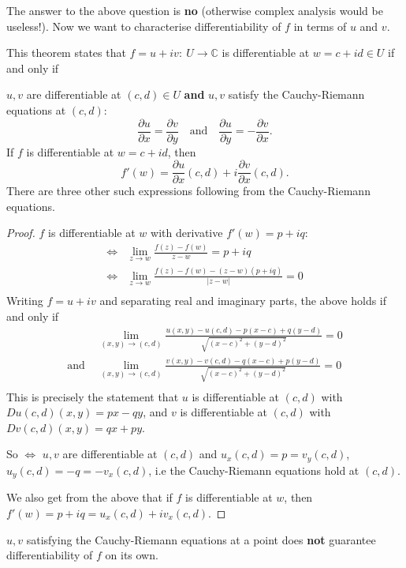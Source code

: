\documentclass[a4paper]{scrartcl}
\begin{document}
The answer to the above question is \textbf{no} (otherwise complex analysis would be useless!). Now we want to characterise differentiability of $f$ in terms of $u$ and $v$. 

\begin{theorem}
     This theorem states that $f=u+iv: \ U \rightarrow \mathbb{C}$ is differentiable at $w=c+id \in U$ if and only if 

     $u,v$ are differentiable at $(c,d) \in U$ \textbf{and} $u,v$ satisfy the Cauchy-Riemann equations at $(c,d)$: \[
     \frac{\partial u}{\partial x}=\frac{\partial v}{\partial y} \quad \text{and} \quad \frac{\partial u}{\partial y}=- \frac{\partial v}{\partial x}
     .\]  
     If $f$ is differentiable at $w=c+id$, then \[
     f' (w)= \frac{\partial u}{\partial x} (c,d)+i \frac{\partial v}{\partial x} (c,d)
     .\]  There are three other such expressions following from the Cauchy-Riemann equations. 
\end{theorem}
\begin{proof}
     $f$ is differentiable at $w$ with derivative $f' (w)=p+iq$:
     \begin{align*}
         \iff & \lim_{z \rightarrow w} \frac{f (z)- f (w)}{z-w}=p+iq\\
         \iff & \lim_{z \rightarrow w} \frac{f (z)- f (w)- (z-w)(p+iq)}{|z-w|}=0\\
     \end{align*}
     Writing $f=u+iv$ and separating real and imaginary parts, the above holds if and only if 
     \begin{align*}
        & \lim_{(x,y) \rightarrow (c,d)} \frac{u (x,y)- u (c,d)-p (x-c)+q (y-d)}{\sqrt{(x-c)^2+ (y-d)^2}}=0\\
        \text{and } & \lim_{(x,y) \rightarrow (c,d)} \frac{v (x,y)- v (c,d)-q (x-c)+p (y-d)}{\sqrt{(x-c)^2+ (y-d)^2}}=0\\
     \end{align*}
     This is precisely the statement that $u$ is differentiable at $(c,d)$ with $Du (c,d)(x,y)=px-qy$, and $v$ is differentiable at $(c,d)$ with $Dv (c,d)(x,y)=qx+py$. 

     So $\iff$ $u,v$ are differentiable at $(c,d)$ and $u_{x}(c,d)=p=v_{y}(c,d)$, $u_{y}(c,d)=-q=-v_{x}(c,d)$, i.e the Cauchy-Riemann equations hold at $(c,d)$. 

     We also get from the above that if $f$ is differentiable at $w$, then $f' (w)=p+iq=u_{x}(c,d)+iv_{x} (c,d)$.  
\end{proof}
\begin{remark}
     $u,v$ satisfying the Cauchy-Riemann equations at a point does \textbf{not} guarantee differentiability of $f$ on its own. 
\end{remark}
\end{document}
